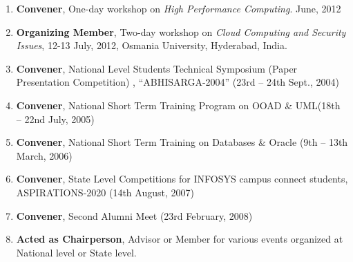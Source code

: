 \begin{enumerate}
\item
\textbf{Convener}, One-day workshop on\textit{ High Performance Computing}. June, 2012

\item
\textbf{Organizing Member}, Two-day workshop on\textit{ Cloud Computing and Security Issues}, 12-13 July, 2012, Osmania University, Hyderabad, India.

\item
\textbf{Convener}, National Level Students Technical Symposium (Paper Presentation Competition) , “ABHISARGA-2004” (23rd – 24th Sept., 2004) 

\item
\textbf{Convener}, National Short Term Training Program on OOAD \& UML(18th – 22nd July, 2005) 

\item
\textbf{Convener}, National Short Term Training on Databases \& Oracle (9th – 13th March, 2006) 

\item
\textbf{Convener}, State Level Competitions for INFOSYS campus connect students, ASPIRATIONS-2020 (14th August, 2007) 

\item
\textbf{Convener}, Second Alumni Meet (23rd February, 2008) 

\item
\textbf{Acted as Chairperson}, Advisor or Member for various events organized at National level or State level.

\end{enumerate}